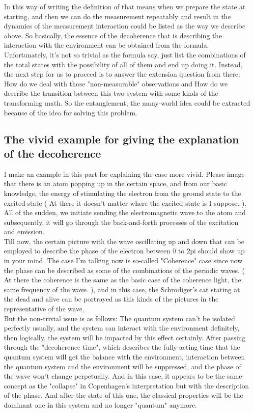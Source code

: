 \documentclass[final,1p,12pt]{elsarticle}
\begin{document}
In this way of writing the definition of that means when we prepare the state at starting, and then we can do the measurement repeatably and result in the dynamics of the measurement interaction could be listed as the way we describe above. So basically, the essence of the decoherence that is describing the interaction with the environment can be obtained from the formula.\\

Unfortunately, it's not so trivial as the formula say, just list the combinations of the total states with the possibility of all of them and end up doing it. Instead, the next step for us to proceed is to answer the extension question from there: How do we deal with those "non-measurable" observations and How do we describe the transition between this two system with some kinds of the transforming math. So the entanglement, the many-world idea could be extracted because of the idea for solving this problem.\\

\subsection{The vivid example for giving the explanation of the decoherence}
I make an example in this part for explaining the case more vivid. Please image that there is an atom popping up in the certain space, and from our basic knowledge, the energy of stimulating the electron from the ground state to the excited state ( At there it doesn't matter where the excited state is I suppose. ). All of the sudden, we initiate sending the electromagnetic wave to the atom and subsequently, it will go through the back-and-forth processes of the excitation and emission. \\

Till now, the certain picture with the wave oscillating up and down that can be employed to describe the phase of the electron between 0 to 2pi should show up in your mind. The case I'm talking now is so-called "Coherence" case since now the phase can be described as some of the combinations of the periodic waves. ( At there the coherence is the same as the basic case of the coherence light, the same frequency of the wave. ), and in this case, the Schrodiger's cat stating at the dead and alive can be portrayed as this kinds of the pictures in the representative of the wave.\\ 

But the non-trivial issue is as follows: The quantum system can't be isolated perfectly usually, and the system can interact with the environment definitely, then logically, the system will be impacted by this effect certainly. After passing through the "decoherence time", which describes the fully-acting time that the quantum system will get the balance with the environment, interaction between the quantum system and the environment will be suppressed, and the phase of the wave won't change perpetually. And in this case, it appears to be the same concept as the "collapse" in Copenhagen's interpretation but with the description of the phase. And after the state of this one, the classical properties will be the dominant one in this system and no longer "quantum" anymore.\\
\end{document}
